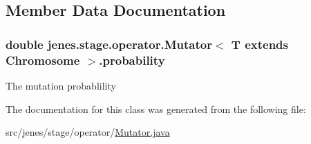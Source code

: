 \subsection{Member Data Documentation}
\hypertarget{classjenes_1_1stage_1_1operator_1_1_mutator_3_01_t_01extends_01_chromosome_01_4_a60f38eb7afd1ad6a7d1c0c639df2d5fe}{
\subsubsection[{probability}]{\setlength{\rightskip}{0pt plus 5cm}double jenes.\-stage.\-operator.\-Mutator$<$ T extends Chromosome $>$.probability\hspace{0.3cm}{\ttfamily [protected]}}}\label{classjenes_1_1stage_1_1operator_1_1_mutator_3_01_t_01extends_01_chromosome_01_4_a60f38eb7afd1ad6a7d1c0c639df2d5fe}
The mutation probablility 

The documentation for this class was generated from the following file\-:\begin{DoxyCompactItemize}
\item 
src/jenes/stage/operator/\hyperlink{_mutator_8java}{Mutator.\-java}\end{DoxyCompactItemize}
